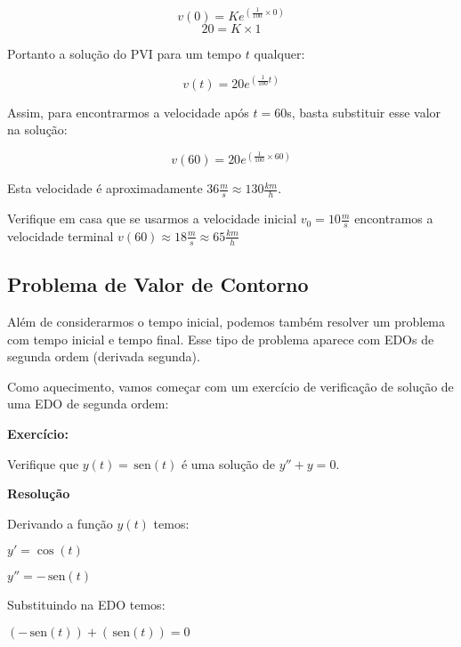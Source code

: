 \documentclass[a4paper]{article}
\providecommand{\sin}{} \renewcommand{\sin}{\hspace{2pt}\mathrm{sen}}
\begin{document}
\begin{displaymath}
  v(0) = Ke^{(\frac{1}{100}\times 0)}
\end{displaymath}
\begin{displaymath}
  20 = K \times 1
\end{displaymath}

Portanto a solução do PVI para um tempo $t$ qualquer:

\begin{displaymath}
  v(t) = 20e^{(\frac{1}{100}t)}
\end{displaymath}

Assim, para encontrarmos a velocidade após $t=60$s, basta substituir
esse valor na solução:

\begin{displaymath}
  v(60) = 20e^{(\frac{1}{100}\times 60)}
\end{displaymath}

Esta velocidade é aproximadamente $36\frac{m}{s} \approx 130\frac{km}{h}$.

Verifique em casa que se usarmos a velocidade inicial
$v_0=10\frac{m}{s}$ encontramos a velocidade terminal
$v(60) \approx 18\frac{m}{s} \approx 65\frac{km}{h}$

\subsection{Problema de Valor de Contorno}

Além de considerarmos o tempo inicial, podemos também resolver um
problema com tempo inicial e tempo final. Esse tipo de problema
aparece com EDOs de segunda ordem (derivada segunda).

Como aquecimento, vamos começar com um exercício de verificação de
solução de uma EDO de segunda ordem:

{\bf Exercício:}

Verifique que $y(t) = \sin (t)$ é uma solução de $y''+y=0$.

\bigskip

{\bf Resolução}


Derivando a função $y(t)$ temos:

$y' = \cos(t)$

$y'' = -\sin(t)$

Substituindo na EDO temos:

$\left(-\sin(t)\right) + \left(\sin(t)\right) =0$
\end{document}
